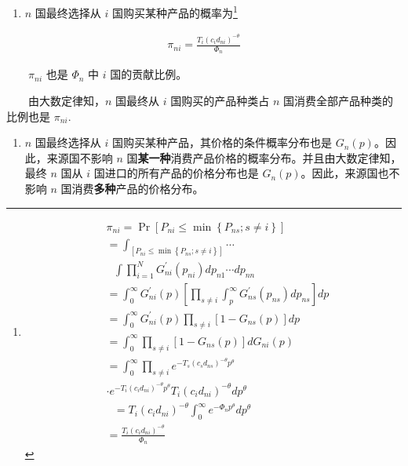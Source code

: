 \documentclass[]{article}
\providecommand{\tightlist}{%
  \setlength{\itemsep}{0pt}\setlength{\parskip}{0pt}}
\let\rmarkdownfootnote\footnote%
\def\footnote{\protect\rmarkdownfootnote}
\begin{document}
\begin{enumerate}
\def\labelenumi{\arabic{enumi}.}
\tightlist
\item
  \(n\) 国最终选择从 \(i\) 国购买某种产品的概率为\footnote{\[
    \begin{aligned}
    &\pi_{n i}=\operatorname{Pr}\left[P_{n i} \leq \min \left\{P_{n s}; s \neq i\right\}\right] \\ 
    &=\int_{\left[P_{n i} \leq \min \left\{P_{n s}; s \neq i\right\}\right]}\cdots \\
    & \text {      } {\int \prod_{i=1}^{N} G_{n i}^{\prime} \left(p_{n i}\right) d p_{n 1} \cdots d p_{n n}} \\ 
    &={\int_{0}^{\infty} G_{n i}^{\prime}(p)\left[\prod_{s \neq i} \int_{p}^{\infty}G_{n s}^{\prime}\left(p_{n s}\right) d p_{n s}\right] d p}\\
    &={\int_{0}^{\infty} G_{n i}^{\prime}(p)\prod_{s \neq i} \left [1 - G_{n s}(p)\right] dp} \\
    &=\int_{0}^{\infty} \prod_{s \neq i}\left[1-G_{n s}(p)\right] d G_{ni}(p) \\ 
    &=\int_{0}^{\infty} \prod_{s \neq i}e^{ -T_{s}\left(c_{s} d_{n s}\right)^{-\theta} p^{\theta}} \\
    & \cdot e^{ -T_{i}\left(c_{i} d_{n i}\right)^{-\theta} p^{\theta}} T_{i}\left(c_{i} d_{n i}\right)^{-\theta} d p^{\theta}\\
    & \text {      }=T_{i}\left(c_{i} d_{n i}\right)^{-\theta}\int_{0}^{\infty} e^{ -\Phi_n p^{\theta}}  d p^{\theta}\\
    &=\frac{T_{i}\left(c_{i} d_{n i}\right)^{-\theta}}{\Phi_{n}} 
    \end{aligned} 
    \]}
\end{enumerate}

\begin{align}
\pi_{n i}=\frac{T_{i}\left(c_{i} d_{n i}\right)^{-\theta}}{\Phi_{n}}  \label{eq:8}
\end{align}

　　\(\pi_{ni}\) 也是 \(\Phi_{n}\) 中 \(i\) 国的贡献比例。

　　由大数定律知，\(n\) 国最终从 \(i\) 国购买的产品种类占 \(n\) 国消费全部产品种类的比例也是 \(\pi_{ni}\).

\begin{enumerate}
\def\labelenumi{\arabic{enumi}.}
\setcounter{enumi}{1}
\tightlist
\item
  \(n\) 国最终选择从 \(i\) 国购买某种产品，其价格的条件概率分布也是 \(G_{n}(p)\)。因此，来源国不影响 \(n\) 国\textbf{某一种}消费产品价格的概率分布。并且由大数定律知，最终 \(n\) 国从 \(i\) 国进口的所有产品的价格分布也是 \(G_{n}(p)\)。因此，来源国也不影响 \(n\) 国消费\textbf{多种}产品的价格分布。
\end{enumerate}
\end{document}
